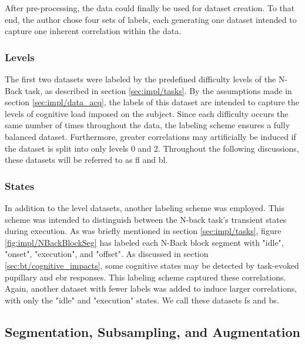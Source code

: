 After pre-processing, the data could finally be used for dataset creation. To that end, the author chose four sets of labels, each generating one dataset intended to capture one inherent correlation within the data.

\subsubsection{Levels}

The first two datasets were labeled by the predefined difficulty levels of the N-Back task, as described in section \ref{sec:impl/tasks}. By the assumptions made in section \ref{sec:impl/data_acq}, the labels of this dataset are intended to capture the levels of cognitive load imposed on the subject. Since each difficulty occurs the same number of times throughout the data, the labeling scheme ensures a fully balanced dataset. Furthermore, greater correlations may artificially be induced if the dataset is split into only levels 0 and 2. Throughout the following discussions, these datasets will be referred to as \acrfull{fl} and \acrfull{bl}.

\subsubsection{States}

In addition to the level datasets, another labeling scheme was employed. This scheme was intended to distinguish between the N-back task's transient states during execution. 
As was briefly mentioned in section \ref{sec:impl/tasks}, figure \ref{fig:impl/NBackBlockSeg} has labeled each N-Back block segment with "idle", "onset", "execution", and "offset". 
As discussed in section \ref{sec:bt/cognitive_impacts}, some cognitive states may be detected by task-evoked pupillary and \acrshort{ebr} responses. This labeling scheme captured these correlations. Again, another dataset with fewer labels was added to induce larger correlations, with only the "idle" and "execution" states. We call these datasets \acrfull{fs} and \acrfull{bs}.

\subsection{Segmentation, Subsampling, and Augmentation}

